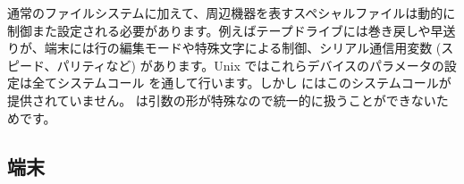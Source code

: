 通常のファイルシステムに加えて、周辺機器を表すスペシャルファイルは動的に制御また設定される必要があります。例えばテープドライブには巻き戻しや早送りが、端末には行の編集モードや特殊文字による制御、シリアル通信用変数 (スピード、パリティなど) があります。Unix ではこれらデバイスのパラメータの設定は全てシステムコール  を通して行います。しかし \ocaml にはこのシステムコールが提供されていません。 は引数の形が特殊なので統一的に扱うことができないためです。

\subsection*{\label{sec/termio}端末}

